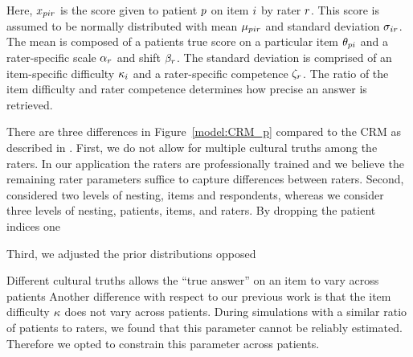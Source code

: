 \documentclass[a4paper,11pt]{article}
\begin{document}
Here, $x_{pir}$ is the score given to patient $p$ on item $i$ by rater $r$.
This score is assumed to be normally distributed with mean $\mu_{pir}$ and standard deviation $\sigma_{ir}$.
The mean is composed of a patients true score on a particular item $\theta_{pi}$ and a rater-specific scale $\alpha_r$ and shift $\beta_r$.
The standard deviation is comprised of an item-specific difficulty $\kappa_i$ and a rater-specific competence $\zeta_r$.
The ratio of the item difficulty and rater competence determines how precise an answer is retrieved.

There are three differences in Figure~\ref{model:CRM_p} compared to the CRM as described in \textcite{anders2014cultural}.
First, we do not allow for multiple cultural truths among the raters.
In our application the raters are professionally trained and we believe the remaining rater parameters suffice to capture differences between raters.
Second, \parencite{anders2014cultural} considered two levels of nesting, items and respondents, whereas we consider three levels of nesting, patients, items, and raters.
By dropping the patient indices one

Third, we adjusted the prior distributions opposed


Different cultural truths allows the ``true answer'' on an item to vary across patients
Another difference with respect to our previous work \parencite{vandenBergh2020cultural} is that the item difficulty $\kappa$ does not vary across patients.
During simulations with a similar ratio of patients to raters, we found that this parameter cannot be reliably estimated.
Therefore we opted to constrain this parameter across patients.
\fi
\end{document}
